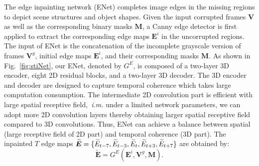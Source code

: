 The edge inpainting network (ENet) completes image edges in the missing regions to depict scene structures and object shapes.
Given the input corrupted frames $\boldsymbol{V}$ as well as the corresponding binary masks $\boldsymbol{M}$, a Canny edge detector is first applied to extract the corresponding edge maps $\boldsymbol{E}^{i}$ in the uncorrupted regions. %
The input of ENet is {\color{blue}the concatenation of }the incomplete grayscale version of frames $\boldsymbol{V}^{g}$, initial edge maps $\boldsymbol{E}^{i}$, and their corresponding masks $\boldsymbol{M}$.
%
As shown in Fig.~\ref{fig:stiNet}, our ENet, denoted by $G^E$, is composed of a two-layer 3D encoder, eight 2D residual blocks, and a two-layer 3D decoder. 
The 3D encoder and decoder are designed to {\color{blue}capture temporal coherence which takes large computation consumption. The intermediate 2D convolution part is efficient with large spatial receptive field,~\emph{i.m.} under a limited network parameters, we can adopt more 2D convolution layers thereby obtaining larger spatial receptive field compared to 3D convolutions. Thus, ENet can achieve a balance between spatial (large receptive field of 2D part) and temporal coherence (3D part).}
The inpainted $T$ edge maps 	$\boldsymbol{\widetilde{E}}=\{\widetilde{E}_{t-7},\widetilde{E}_{t-3},\widetilde{E}_{t},\widetilde{E}_{t+3},\widetilde{E}_{t+7}\}$ are obtained by:
\begin{equation}
	\label{eq:edgenet}
	\boldsymbol{\widetilde{E}}=G^E(\boldsymbol{E}^{i},\boldsymbol{V}^{g},\boldsymbol{M}).
\end{equation}

